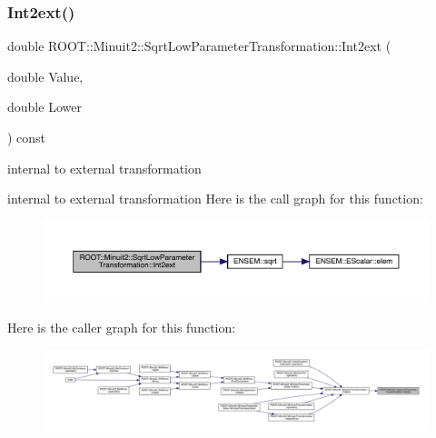 \mbox{\label{classROOT_1_1Minuit2_1_1SqrtLowParameterTransformation_aaa3325280a05beb0e3f07b542d0aa7d8}} 
\subsubsection{\texorpdfstring{Int2ext()}{Int2ext()}\hspace{0.1cm}{\footnotesize\ttfamily [2/3]}}
{\footnotesize\ttfamily double R\+O\+O\+T\+::\+Minuit2\+::\+Sqrt\+Low\+Parameter\+Transformation\+::\+Int2ext (\begin{DoxyParamCaption}\item[{double}]{Value,  }\item[{double}]{Lower }\end{DoxyParamCaption}) const}

internal to external transformation

internal to external transformation Here is the call graph for this function\+:
\nopagebreak
\begin{figure}[H]
\begin{center}
\leavevmode
\includegraphics[width=350pt]{df/db9/classROOT_1_1Minuit2_1_1SqrtLowParameterTransformation_aaa3325280a05beb0e3f07b542d0aa7d8_cgraph}
\end{center}
\end{figure}
Here is the caller graph for this function\+:
\nopagebreak
\begin{figure}[H]
\begin{center}
\leavevmode
\includegraphics[width=350pt]{df/db9/classROOT_1_1Minuit2_1_1SqrtLowParameterTransformation_aaa3325280a05beb0e3f07b542d0aa7d8_icgraph}
\end{center}
\end{figure}
\mbox{\label{classROOT_1_1Minuit2_1_1SqrtLowParameterTransformation_aaa3325280a05beb0e3f07b542d0aa7d8}} 

